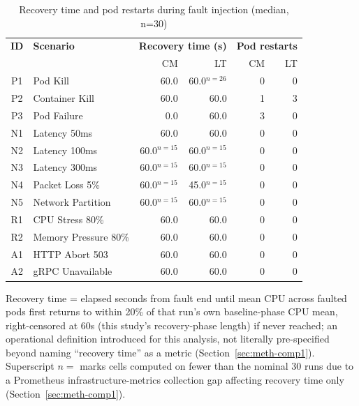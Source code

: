 \begin{table}[ht]
\centering
\caption{Recovery time and pod restarts during fault injection (median, n=30)}
\label{tab:overhead}
\small
\begin{tabular}{clrrrr}
\hline
\textbf{ID} & \textbf{Scenario} & \multicolumn{2}{c}{\textbf{Recovery time (s)}} & \multicolumn{2}{c}{\textbf{Pod restarts}} \\
& & CM & LT & CM & LT \\
\hline
P1 & Pod Kill & 60.0 & 60.0$^{n=26}$ & 0 & 0 \\
P2 & Container Kill & 60.0 & 60.0 & 1 & 3 \\
P3 & Pod Failure & 0.0 & 60.0 & 3 & 0 \\
N1 & Latency 50ms & 60.0 & 60.0 & 0 & 0 \\
N2 & Latency 100ms & 60.0$^{n=15}$ & 60.0$^{n=15}$ & 0 & 0 \\
N3 & Latency 300ms & 60.0$^{n=15}$ & 60.0$^{n=15}$ & 0 & 0 \\
N4 & Packet Loss 5\% & 60.0$^{n=15}$ & 45.0$^{n=15}$ & 0 & 0 \\
N5 & Network Partition & 60.0$^{n=15}$ & 60.0$^{n=15}$ & 0 & 0 \\
R1 & CPU Stress 80\% & 60.0 & 60.0 & 0 & 0 \\
R2 & Memory Pressure 80\% & 60.0 & 60.0 & 0 & 0 \\
A1 & HTTP Abort 503 & 60.0 & 60.0 & 0 & 0 \\
A2 & gRPC Unavailable & 60.0 & 60.0 & 0 & 0 \\
\hline
\end{tabular}
\vspace{2mm}
\raggedright\footnotesize Recovery time = elapsed seconds from fault end until mean CPU across faulted pods first returns to within 20\% of that run's own baseline-phase CPU mean, right-censored at 60s (this study's recovery-phase length) if never reached; an operational definition introduced for this analysis, not literally pre-specified beyond naming ``recovery time'' as a metric (Section~\ref{sec:meth-comp1}). Superscript $n=$ marks cells computed on fewer than the nominal 30 runs due to a Prometheus infrastructure-metrics collection gap affecting recovery time only (Section~\ref{sec:meth-comp1}).
\end{table}